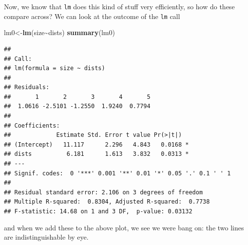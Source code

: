 \documentclass[
]{book}
\newenvironment{Shaded}{\begin{snugshade}}{\end{snugshade}}
\newcommand{\AttributeTok}[1]{\textcolor[rgb]{0.13,0.29,0.53}{#1}}
\newcommand{\DecValTok}[1]{\textcolor[rgb]{0.00,0.00,0.81}{#1}}
\newcommand{\FunctionTok}[1]{\textcolor[rgb]{0.13,0.29,0.53}{\textbf{#1}}}
\newcommand{\NormalTok}[1]{#1}
\newcommand{\OtherTok}[1]{\textcolor[rgb]{0.56,0.35,0.01}{#1}}
\newcommand{\SpecialCharTok}[1]{\textcolor[rgb]{0.81,0.36,0.00}{\textbf{#1}}}
\newcommand{\StringTok}[1]{\textcolor[rgb]{0.31,0.60,0.02}{#1}}
\begin{document}
Now, we know that \texttt{lm} does this kind of stuff very efficiently, so how do these compare across? We can look at the outcome of the \texttt{lm} call

\begin{Shaded}
\begin{Highlighting}[]
\NormalTok{lm0}\OtherTok{\textless{}{-}}\FunctionTok{lm}\NormalTok{(size}\SpecialCharTok{\textasciitilde{}}\NormalTok{dists)}
\FunctionTok{summary}\NormalTok{(lm0)}
\end{Highlighting}
\end{Shaded}

\begin{verbatim}
## 
## Call:
## lm(formula = size ~ dists)
## 
## Residuals:
##       1       2       3       4       5 
##  1.0616 -2.5101 -1.2550  1.9240  0.7794 
## 
## Coefficients:
##             Estimate Std. Error t value Pr(>|t|)  
## (Intercept)   11.117      2.296   4.843   0.0168 *
## dists          6.181      1.613   3.832   0.0313 *
## ---
## Signif. codes:  0 '***' 0.001 '**' 0.01 '*' 0.05 '.' 0.1 ' ' 1
## 
## Residual standard error: 2.106 on 3 degrees of freedom
## Multiple R-squared:  0.8304, Adjusted R-squared:  0.7738 
## F-statistic: 14.68 on 1 and 3 DF,  p-value: 0.03132
\end{verbatim}

and when we add these to the above plot, we see we were bang on: the two lines are indistinguishable by eye.

\begin{Shaded}
\end{Shaded}
\end{document}
